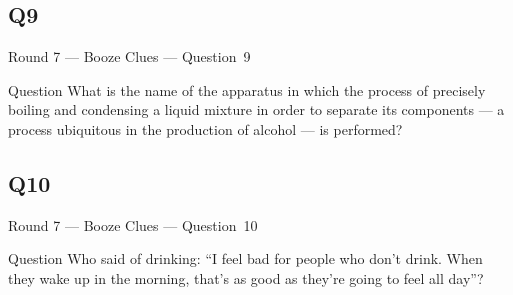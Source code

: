 \documentclass[11pt]{beamer}
\begin{document}
\subsection*{Q9}
\begin{frame}[t]{Round 7 --- Booze Clues --- \mbox{Question 9}}
\vspace{-0.5em}
\begin{block}{Question}
What is the name of the apparatus in which the process of precisely boiling and condensing a liquid mixture in order to separate its components --- a process ubiquitous in the production of alcohol --- is performed?
\end{block}
\end{frame}
\subsection*{Q10}
\begin{frame}[t]{Round 7 --- Booze Clues --- \mbox{Question 10}}
\vspace{-0.5em}
\begin{block}{Question}
Who said of drinking: ``I feel bad for people who don't drink. When they wake up in the morning, that's as good as they're going to feel all day''?
\end{block}
\end{frame}
\end{document}
